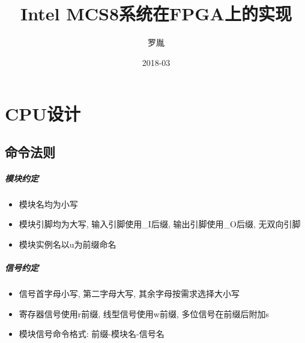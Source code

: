 \documentclass[10pt]{book}
\begin{document}


\newcommand{\red}[1]{\textcolor[rgb]{1.0, 0.0, 0.0}{#1}}
\newcommand{\green}[1]{\textcolor[rgb]{0.0, 1.0, 0.0}{#1}}
\newcommand{\blue}[1]{\textcolor[rgb]{0.0, 0.0, 1.0}{#1}}
\newcommand{\greenblue}[1]{\textcolor[rgb]{0.0, 1.0, 1.0}{#1}}
\newcommand{\redB}[1]{\textcolor[rgb]{1.0, 0.0, 0.0}{\textbf{#1}}}
\newcommand{\greenB}[1]{\textcolor[rgb]{0.0, 1.0, 0.0}{\textbf{#1}}}
\newcommand{\blueB}[1]{\textcolor[rgb]{0.0, 0.0, 1.0}{\textbf{#1}}}
\newcommand{\greenblueB}[1]{\textcolor[rgb]{0.0, 1.0, 1.0}{\textbf{#1}}}
\newcommand{\mypath}[1]{/home/luoyin/Notes2016/ECG_Analysis/{#1}/}

\title{Intel MCS8系统在FPGA上的实现}
\author{罗胤}
\date{2018-03}
\maketitle

\tableofcontents

\chapter{CPU设计}
\section{命令法则}
\paragraph{模块约定}
\begin{itemize}
  \item 模块名均为小写
  \item 模块引脚均为大写, 输入引脚使用\blue{\_I}后缀, 输出引脚使用\blue{\_O}后缀, 无双向引脚
  \item 模块实例名以\blue{u}为前缀命名
\end{itemize}

\paragraph{信号约定}
\begin{itemize}
  \item 信号首字母小写, 第二字母大写, 其余字母按需求选择大小写
  \item 寄存器信号使用\blue{r}前缀, 线型信号使用\blue{w}前缀, 多位信号在前缀后附加\blue{s}
  \item 模块信号命令格式: 前缀-模块名-信号名
\end{itemize}
\end{document}
